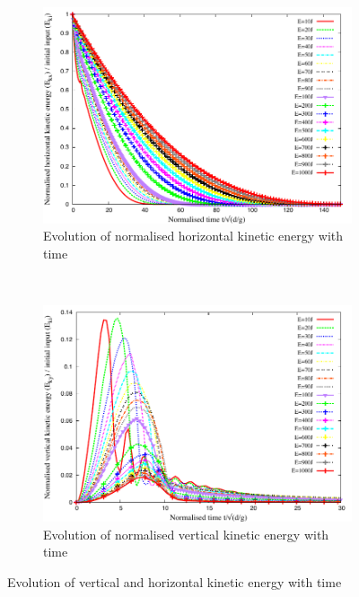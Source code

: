 \begin{figure}[tbhp]
\centering
\begin{subfigure}[b]{0.975\textwidth}
\includegraphics[width=\textwidth]{Normalised_KEx_Slope}
\caption{Evolution of normalised horizontal kinetic energy with time}
\label{fig:Normalised_KEx_Slope}
\end{subfigure}
\\
\begin{subfigure}[b]{0.975\textwidth}
\centering
\includegraphics[width=\textwidth]{Normalised_KEy_Slope}
\caption{Evolution of normalised vertical kinetic energy with time}
\label{fig:Normalised_KEy_Slope}
\end{subfigure}
\caption{Evolution of vertical and horizontal kinetic energy with time}
\label{fig:Normalised_KEx_KEy_Slope}
\end{figure}

